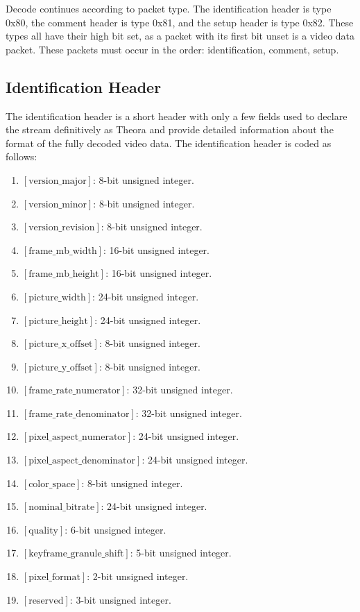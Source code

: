 \documentclass[11pt,letterpaper]{article}
\newcommand{\bitvar}[1]{\ensuremath{\left[\mathrm{#1}\right]}}
\begin{document}
Decode continues according to packet type.
The identification header is type 0x80, the comment header is type 0x81, and
 the setup header is type 0x82.
These types all have their high bit set, as a packet with its first bit unset
 is a video data packet.
These packets must occur in the order: identification, comment, setup.

\subsection{Identification Header}
\label{sec:idheader}

The identification header is a short header with only a few fields used to
 declare the stream definitively as Theora and provide detailed information
 about the format of the fully decoded video data.
The identification header is coded as follows:

\begin{enumerate}
\item{\bitvar{version\_major}:} 8-bit unsigned integer.
\item{\bitvar{version\_minor}:} 8-bit unsigned integer.
\item{\bitvar{version\_revision}:} 8-bit unsigned integer.
\item{\bitvar{frame\_mb\_width}:} 16-bit unsigned integer.
\item{\bitvar{frame\_mb\_height}:} 16-bit unsigned integer.
\item{\bitvar{picture\_width}:} 24-bit unsigned integer.
\item{\bitvar{picture\_height}:} 24-bit unsigned integer.
\item{\bitvar{picture\_x\_offset}:} 8-bit unsigned integer.
\item{\bitvar{picture\_y\_offset}:} 8-bit unsigned integer.
\item{\bitvar{frame\_rate\_numerator}:} 32-bit unsigned integer.
\item{\bitvar{frame\_rate\_denominator}:} 32-bit unsigned integer.
\item{\bitvar{pixel\_aspect\_numerator}:} 24-bit unsigned integer.
\item{\bitvar{pixel\_aspect\_denominator}:} 24-bit unsigned integer.
\item{\bitvar{color\_space}:} 8-bit unsigned integer.
\item{\bitvar{nominal\_bitrate}:} 24-bit unsigned integer.
\item{\bitvar{quality}:} 6-bit unsigned integer.
\item{\bitvar{keyframe\_granule\_shift}:} 5-bit unsigned integer.
\item{\bitvar{pixel\_format}:} 2-bit unsigned integer.
\item{\bitvar{reserved}:} 3-bit unsigned integer.
\end{enumerate}
\end{document}
